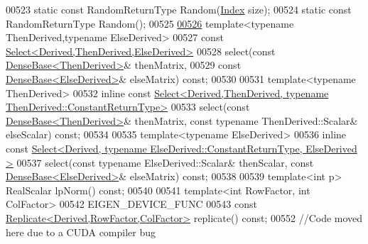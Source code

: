 \begin{DoxyCode}
00523     \textcolor{keyword}{static} \textcolor{keyword}{const} RandomReturnType Random(\hyperlink{namespace_eigen_a62e77e0933482dafde8fe197d9a2cfde}{Index} size);
00524     \textcolor{keyword}{static} \textcolor{keyword}{const} RandomReturnType Random();
00525 
\hyperlink{group___core___module_ae4efe1d66eb46763d997910f60cc00ba}{00526}     \textcolor{keyword}{template}<\textcolor{keyword}{typename} ThenDerived,\textcolor{keyword}{typename} ElseDerived>
00527     \textcolor{keyword}{const} \hyperlink{group___core___module_class_eigen_1_1_select}{Select<Derived,ThenDerived,ElseDerived>}
00528     select(\textcolor{keyword}{const} \hyperlink{group___core___module_class_eigen_1_1_dense_base}{DenseBase<ThenDerived>}& thenMatrix,
00529            \textcolor{keyword}{const} \hyperlink{group___core___module_class_eigen_1_1_dense_base}{DenseBase<ElseDerived>}& elseMatrix) \textcolor{keyword}{const};
00530 
00531     \textcolor{keyword}{template}<\textcolor{keyword}{typename} ThenDerived>
00532     \textcolor{keyword}{inline} \textcolor{keyword}{const} 
      \hyperlink{group___core___module_class_eigen_1_1_select}{Select<Derived,ThenDerived, typename ThenDerived::ConstantReturnType>}
00533     select(\textcolor{keyword}{const} \hyperlink{group___core___module_class_eigen_1_1_dense_base}{DenseBase<ThenDerived>}& thenMatrix, \textcolor{keyword}{const} \textcolor{keyword}{typename} 
      ThenDerived::Scalar& elseScalar) \textcolor{keyword}{const};
00534 
00535     \textcolor{keyword}{template}<\textcolor{keyword}{typename} ElseDerived>
00536     \textcolor{keyword}{inline} \textcolor{keyword}{const} 
      \hyperlink{group___core___module_class_eigen_1_1_select}{Select<Derived, typename ElseDerived::ConstantReturnType, ElseDerived >}
00537     select(\textcolor{keyword}{const} \textcolor{keyword}{typename} ElseDerived::Scalar& thenScalar, \textcolor{keyword}{const} 
      \hyperlink{group___core___module_class_eigen_1_1_dense_base}{DenseBase<ElseDerived>}& elseMatrix) \textcolor{keyword}{const};
00538 
00539     \textcolor{keyword}{template}<\textcolor{keywordtype}{int} p> RealScalar lpNorm() \textcolor{keyword}{const};
00540 
00541     \textcolor{keyword}{template}<\textcolor{keywordtype}{int} RowFactor, \textcolor{keywordtype}{int} ColFactor>
00542     EIGEN\_DEVICE\_FUNC
00543     \textcolor{keyword}{const} \hyperlink{group___core___module_class_eigen_1_1_replicate}{Replicate<Derived,RowFactor,ColFactor>} replicate() \textcolor{keyword}{const};
00552     \textcolor{comment}{//Code moved here due to a CUDA compiler bug}

\end{DoxyCode}
